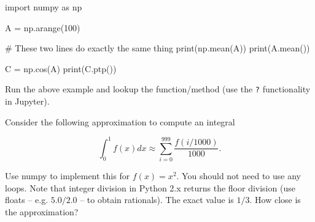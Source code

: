 \begin{python}
import numpy as np

A = np.arange(100)

# These two lines do exactly the same thing
print(np.mean(A))
print(A.mean())

C = np.cos(A)
print(C.ptp())
\end{python}

\begin{exercise}
Run the above example and lookup the  function/method (use the \texttt{?} functionality in Jupyter).
\end{exercise}


\begin{exercise}
Consider the following approximation to compute an integral

\[
\int_0^{1} f(x)dx \approx \sum_{i = 0}^{999} \frac{f(i/1000)}{1000}.
\]

Use numpy to implement this for $f(x) = x^2$. You should not need to use any loops. Note that integer division in Python 2.x returns the floor division (use floats -- e.g. $5.0/2.0$ -- to obtain rationals). The exact value is $1/3$. How close is the approximation?
\end{exercise}

